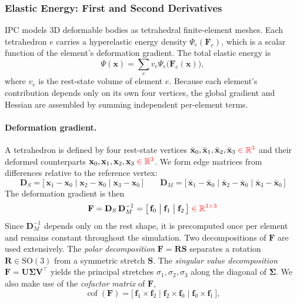 \documentclass{article}
\newcommand{\red}[1]{\textcolor{red}{#1}}
\begin{document}
\subsubsection{Elastic Energy: First and Second Derivatives}

IPC models 3D deformable bodies as tetrahedral finite-element meshes. Each tetrahedron $e$ carries a hyperelastic energy density $\Psi_e(\mathbf{F}_e)$, which is a scalar function of the element's deformation gradient. The total elastic energy is
\begin{equation}
    \Psi(\mathbf{x})
    = \sum_e v_e\Psi_e\bigl(\mathbf{F}_e(\mathbf{x})\bigr),
\end{equation}
where $v_e$ is the rest-state volume of element $e$. Because each element's contribution depends only on its own four vertices, the global gradient and Hessian are assembled by summing independent per-element terms.

\paragraph{Deformation gradient.}
A tetrahedron is defined by four rest-state vertices $\bar{\mathbf{x}}_0,\bar{\mathbf{x}}_1,\bar{\mathbf{x}}_2,\bar{\mathbf{x}}_3 \;\red{\in\mathbb{R}^3}$ and their deformed counterparts $\mathbf{x}_0,\mathbf{x}_1,\mathbf{x}_2,\mathbf{x}_3\;\red{\in\mathbb{R}^3}$. We form edge matrices from differences relative to the reference vertex:
\begin{equation*}
    \mathbf{D}_S
    = \bigl[\,\mathbf{x}_1-\mathbf{x}_0
    \;\big|\; \mathbf{x}_2-\mathbf{x}_0
    \;\big|\; \mathbf{x}_3-\mathbf{x}_0\,\bigr]
    \qquad
    \mathbf{D}_M
    = \bigl[\,\bar{\mathbf{x}}_1-\bar{\mathbf{x}}_0
    \;\big|\; \bar{\mathbf{x}}_2-\bar{\mathbf{x}}_0
    \;\big|\; \bar{\mathbf{x}}_3-\bar{\mathbf{x}}_0\,\bigr]
\end{equation*}
The deformation gradient is then
\begin{equation*}
    \mathbf{F}
    = \mathbf{D}_S\,\mathbf{D}_M^{-1}
    = \bigl[\,\mathbf{f}_0 \;\big|\; \mathbf{f}_1 \;\big|\; \mathbf{f}_2\,\bigr]
    \;\red{\in\mathbb{R}^{3\times 3}}
\end{equation*}
Since $\mathbf{D}_M^{-1}$ depends only on the rest shape, it is precomputed once per element and remains constant throughout the simulation.
\newline Two decompositions of $\mathbf{F}$ are used extensively. The \emph{polar decomposition} $\mathbf{F}=\mathbf{R}\mathbf{S}$ separates a rotation $\mathbf{R}\in\mathrm{SO}(3)$ from a symmetric stretch $\mathbf{S}$. The \emph{singular value decomposition} $\mathbf{F}=\mathbf{U}\boldsymbol{\Sigma}\mathbf{V}^\top$ yields the principal stretches $\sigma_1,\sigma_2,\sigma_3$ along the diagonal of $\boldsymbol{\Sigma}$.
\newline We also make use of the \emph{cofactor matrix} of $\mathbf{F}$,
\begin{equation*}
    \operatorname{cof}(\mathbf{F})
    = \bigl[\,\mathbf{f}_1\times\mathbf{f}_2
    \;\big|\; \mathbf{f}_2\times\mathbf{f}_0
    \;\big|\; \mathbf{f}_0\times\mathbf{f}_1\,\bigr],
\end{equation*}
\end{document}
